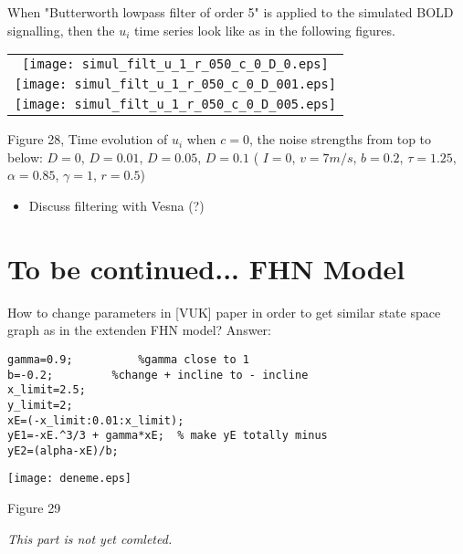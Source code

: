 \documentclass{article}
\begin{document}
When "Butterworth lowpass filter of order 5" is applied to the simulated BOLD signalling, then the $u_i$ time series look like as in the following figures.  

\begin{center}
  \begin{tabular}{@{} c@{} }
    \texttt{[image: simul\_filt\_u\_1\_r\_050\_c\_0\_D\_0.eps]} \\
    \texttt{[image: simul\_filt\_u\_1\_r\_050\_c\_0\_D\_001.eps]} \\
    \texttt{[image: simul\_filt\_u\_1\_r\_050\_c\_0\_D\_005.eps]} \\
  \end{tabular}
\begin{footnotesize}
 Figure 28, Time evolution of $u_i$ when $c=0$, the noise strengths from top to below: $D=0$, $D=0.01$, $D=0.05$, $D=0.1$ ( $I=0$, $v=7m/s$, $b=0.2$, $\tau=1.25$, $\alpha=0.85$, $\gamma=1$, $r=0.5$)
\end{footnotesize}
\end{center}

\begin{itemize}
 \item Discuss filtering with Vesna (?)
\end{itemize} 

\newpage
\section{To be continued... FHN Model}
How to change parameters in [VUK] paper in order to get similar state space graph as in the extenden FHN model? Answer: 
\begin{lstlisting}
gamma=0.9;  		%gamma close to 1
b=-0.2;    		%change + incline to - incline 
x_limit=2.5;
y_limit=2;
xE=(-x_limit:0.01:x_limit);
yE1=-xE.^3/3 + gamma*xE;  % make yE totally minus
yE2=(alpha-xE)/b;
 \end{lstlisting}


\begin{center}
  
    \texttt{[image: deneme.eps]} \\
 
\begin{footnotesize}
 Figure 29
\end{footnotesize}
\end{center}

\textit{This part is not yet comleted.}
\end{document}
